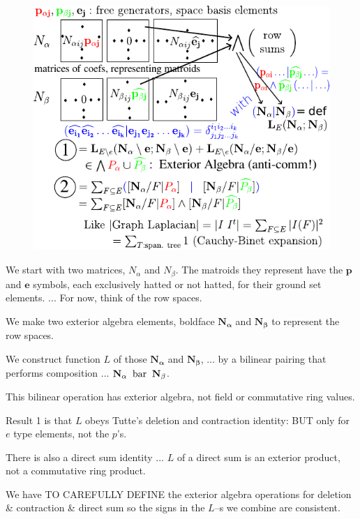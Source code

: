 \documentclass{article}
\begin{document}
\pagebreak

\begin{figure}
  \includegraphics{Brown2025Lightning.pdf}
\end{figure}

   We start with two matrices, $N_\alpha$ and $N_\beta$.  The matroids
    they represent have the $\mathbf{p}$ and $\mathbf{e}$ symbols, each
    exclusively hatted or
    not hatted, for their ground set elements. ...  For now, think of the
    row spaces.

   We make two exterior algebra elements,  boldface
    $\mathbf{N_\alpha}$ and $\mathbf{N_\beta}$ to represent the row spaces.

   We construct function $L$ of those
    $\mathbf{N_\alpha}$ and $\mathbf{N_\beta}$, ... by a bilinear pairing 
    that performs composition ... 
  $\mathbf{N_\alpha} \text{\;\;bar\;\;} \mathbf{N_\beta}$.

   This bilinear operation has exterior algebra,
    not field or commutative ring values. 

 Result 1 is that $L$ obeys Tutte's deletion and contraction identity:  BUT
  only for $e$ type elements, not the $p$'s.  

 There is also a direct sum identity ... $L$ of a direct sum is an exterior product, not
  a commutative ring product.

 We have TO CAREFULLY DEFINE the exterior algebra operations for deletion \&
  contraction \& direct sum so the signs in the $L$--s we combine are consistent.
\end{document}
